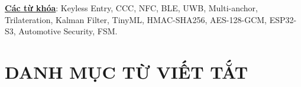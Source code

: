 \documentclass[a4paper,12pt,twoside]{report}
\begin{document}
\par\vspace{2em}
\textbf{\underline{Các từ khóa}}: Keyless Entry, CCC, NFC, BLE, UWB, Multi-anchor, Trilateration, Kalman Filter, TinyML, HMAC-SHA256, AES-128-GCM, ESP32-S3, Automotive Security, FSM.


\newpage
\tableofcontents

\cleardoublepage
{}
{}
\listoffigures
\newpage

\cleardoublepage
{}
{}
\listoftables
\newpage

\chapter*{\MakeUppercase{DANH MỤC TỪ VIẾT TẮT}}
\end{document}
